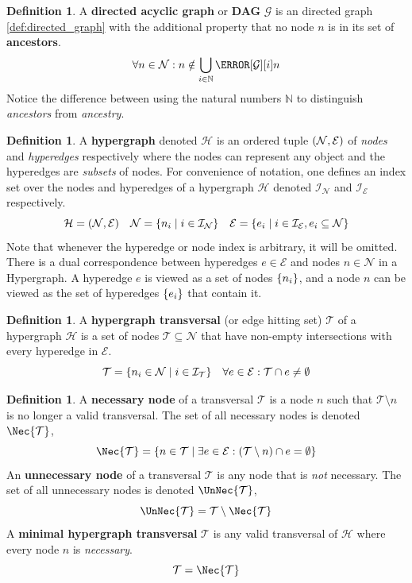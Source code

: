 \documentclass[aps, 10pt, english, twoside, pra, nofootinbib, longbibliography]{revtex4-1}
\theoremstyle{plain}
\theoremstyle{definition}
\newtheorem{definition}[theorem]{Definition}
\theoremstyle{remark}
\newcommand{\hgraph}{\mathcal{H}}
\newcommand{\graph}{\mathcal{G}}
\newcommand{\nodes}{\mathcal{N}}
\newcommand{\edges}{\mathcal{E}}
\newcommand{\trans}{\mathcal{T}}
\newcommand{\ind}{\mathcal{I}}
\newcommand{\term}[1]{\textcolor{Mahogany}{\textbf{#1}}}
\begin{document}
    \begin{definition}
        \label{def:dag}
        A \term{directed acyclic graph} or \term{DAG} $\graph$ is an directed graph \cref{def:directed_graph} with the additional property that no node $n$ is in its set of \term{ancestors}.
        \[ \forall n \in \nodes : n \notin \bigcup_{i\in\mathbb{N}} \Pa[\graph][i]{n}\]
        Notice the difference between using the natural numbers $\mathbb{N}$ to distinguish \textit{ancestors} from \textit{ancestry}.
    \end{definition}

    \begin{definition}
        \label{def:hypergraph}
        A \term{hypergraph} denoted $\hgraph$ is an ordered tuple $\br{\nodes, \edges}$ of \textit{nodes} and \textit{hyperedges} respectively where the nodes can represent any object and the hyperedges are \textit{subsets} of nodes. For convenience of notation, one defines an index set over the nodes and hyperedges of a hypergraph $\hgraph$ denoted $\ind_\nodes$ and $\ind_\edges$ respectively.
        \[ \hgraph = \br{\nodes, \edges} \quad \nodes = \bc{n_i \mid i \in \ind_\nodes} \quad \edges = \bc{e_i \mid i \in \ind_\edges, e_i \subseteq \nodes} \]
        Note that whenever the hyperedge or node index is arbitrary, it will be omitted. There is a dual correspondence between hyperedges $e \in \edges$ and nodes $n \in \nodes$ in a Hypergraph. A hyperedge $e$ is viewed as a set of nodes $\bc{n_i}$, and a node $n$ can be viewed as the set of hyperedges $\bc{e_i}$ that contain it.
    \end{definition}

    \begin{definition}
        \label{def:hgraph_trans}
        A \term{hypergraph transversal} (or edge hitting set) $\trans$ of a hypergraph $\hgraph$ is a set of nodes $\trans \subseteq \nodes$ that have non-empty intersections with every hyperedge in $\edges$.
        \[ \trans = \bc{n_i \in \nodes \mid i \in \ind_\trans } \quad \forall e \in \edges : \trans \cap e \neq \emptyset \]
    \end{definition}

    \begin{definition}
        A \term{necessary node} of a transversal $\trans$ is a node $n$ such that $\trans \setminus n$ is no longer a valid transversal. The set of all necessary nodes is denoted $\Nec{\trans}$,
        \[ \Nec{\trans} = \bc{n \in \trans \mid \exists e \in \edges : \br{\trans \setminus n} \cap e = \emptyset} \]
        An \term{unnecessary node} of a transversal $\trans$ is any node that is \textit{not} necessary. The set of all unnecessary nodes is denoted $\UnNec{\trans}$,
        \[ \UnNec{\trans} = \trans \setminus \Nec{\trans} \]
        A \term{minimal hypergraph transversal} $\trans$ is any valid transversal of $\hgraph$ where every node $n$ is \textit{necessary}.
        \[ \trans = \Nec{\trans} \]
    \end{definition}
\end{document}

